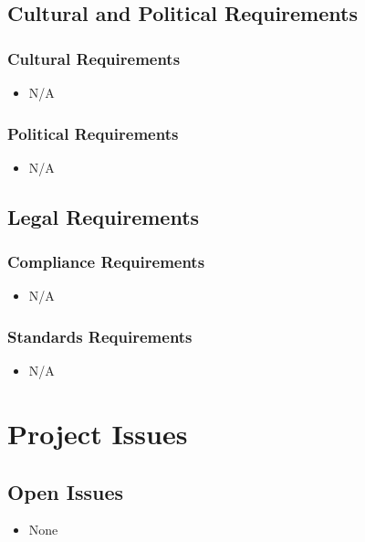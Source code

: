 \documentclass [11pt]{article}
\begin{document}
\subsection{Cultural and Political Requirements } 
\subsubsection{Cultural Requirements }
	\begin{itemize}
		\item N/A
	\end{itemize}

\subsubsection{Political Requirements }
	\begin{itemize}
		\item N/A
	\end{itemize}


\subsection{Legal Requirements}
\subsubsection{Compliance Requirements }
	\begin{itemize}
		\item N/A
	\end{itemize}
	
\subsubsection{Standards Requirements }
	\begin{itemize}
		\item N/A
	\end{itemize}



\section {Project Issues} 


\subsection{Open Issues}
	\begin{itemize}
		\item  None
	\end{itemize}
\end{document}
